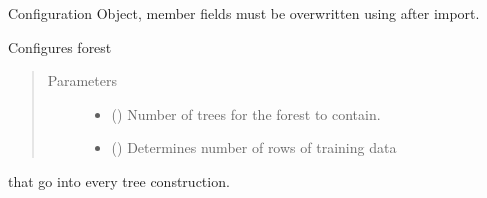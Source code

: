 \documentclass[letterpaper,10pt,english]{sphinxmanual}
\begin{document}
\begin{fulllineitems}
\label{\detokenize{forest:random_forest.forest.Config}}
Configuration Object, member fields must be overwritten using {\hyperref[\detokenize{forest:random_forest.forest.Config.create_config}]{}} after import.

\begin{fulllineitems}
\label{\detokenize{forest:random_forest.forest.Config.create_config}}
Configures forest
\begin{quote}\begin{description}
\item[{Parameters}] \leavevmode\begin{itemize}
\item {} 
 () \textendash{} Number of trees for the forest to contain.

\item {} 
 () \textendash{} Determines number of rows of training data

\end{itemize}

\end{description}\end{quote}

that go into every tree construction.

\end{fulllineitems}


\end{fulllineitems}

\end{document}
